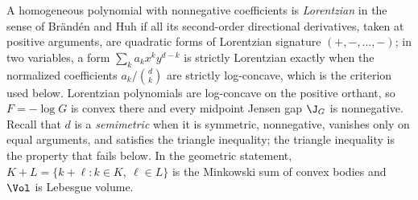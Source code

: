 A homogeneous polynomial with nonnegative coefficients is \emph{Lorentzian} in the sense of Br\"and\'en and Huh \citeyearpar{BrandenHuh} if all its second-order directional derivatives, taken at positive arguments, are quadratic forms of Lorentzian signature $(+,-,\ldots,-)$; in two variables, a form $\sum_{k}a_kx^ky^{d-k}$ is strictly Lorentzian exactly when the normalized coefficients $a_k/\binom dk$ are strictly log-concave, which is the criterion used below.  Lorentzian polynomials are log-concave on the positive orthant, so $F=-\log G$ is convex there and every midpoint Jensen gap $\J_G$ is nonnegative.  Recall that $d$ is a \emph{semimetric} when it is symmetric, nonnegative, vanishes only on equal arguments, and satisfies the triangle inequality; the triangle inequality is the property that fails below.  In the geometric statement, $K+L=\{k+\ell:k\in K,\ \ell\in L\}$ is the Minkowski sum of convex bodies and $\Vol$ is Lebesgue volume.
